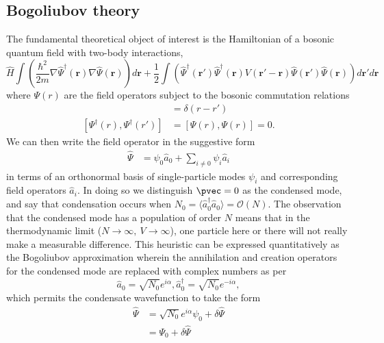 \subsection*{Bogoliubov theory}
	The fundamental theoretical object of interest is the Hamiltonian of a bosonic quantum field with two-body interactions,
	\begin{equation}
		\hat{H} \int\left(\frac{\hbar^2}{2m}\nabla\hat{\Psi}^\dagger(\textbf{r})\nabla\hat{\Psi}(\textbf{r})\right)d\textbf{r} + \frac{1}{2}\int\left(\hat{\Psi}^\dagger(\textbf{r}')\hat{\Psi}^\dagger(\textbf{r})V(\textbf{r}'-\textbf{r}) \hat{\Psi}(\textbf{r}')\hat{\Psi}(\textbf{r})\right)d\textbf{r}'d\textbf{r}
		\label{eqn:ham}
	\end{equation}
	where $\Psi(r)$ are the field operators subject to the bosonic commutation relations
	\begin{align}
		[\Psi(r),\Psi^\dagger(r')] &= \delta(r-r')\\
		 [\Psi^\dagger(r),\Psi^\dagger(r')]&=[\Psi(r),\Psi(r)]=0.
	\end{align}	
	We can then write the field operator in the suggestive form	
	\begin{align}
		\hat{\Psi} &= \psi_0 \hat{a}_0 + \sum_{i\neq0}\psi_i \hat{a}_i
	\end{align}
	in terms of an orthonormal basis of single-particle modes $\psi_i$ and corresponding field operators $\hat{a}_i$.
	In doing so we distinguish $\pvec=0$ as the condensed mode, and say that condensation occurs when $N_0=\langle\hat{a}^\dagger_0\hat{a}_0\rangle =\mathcal{O}(N)$.
	The observation that the condensed mode has a population of order $N$ means that in the thermodynamic limit ($N\rightarrow\infty,~V\rightarrow\infty$), one particle here or there will not really make a measurable difference.
	This heuristic can be expressed quantitatively as the Bogoliubov approximation wherein the annihilation and creation operators for the condensed mode are replaced with complex numbers as per
	\begin{equation}
		\hat{a}_0 = \sqrt{N_0}e^{i\alpha}, \hat{a}_0^\dagger= \sqrt{N_0}e^{-i\alpha}, 
	\end{equation}
	which permits the condensate wavefunction to take the form
	\begin{align}
		\hat{\Psi} &= \sqrt{N_0}e^{i\alpha} \psi_0 + \delta\hat{\Psi}\\
					&= \Psi_0 + \delta\hat{\Psi}
	\end{align}


